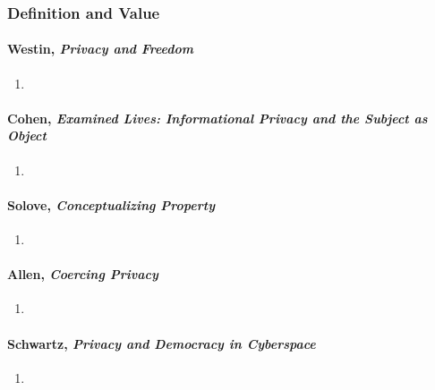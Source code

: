 
\subsubsection{Definition and Value}

\paragraph{Westin, \emph{Privacy and Freedom}}

\begin{enumerate}
    \item %
\end{enumerate}

\paragraph{Cohen, \emph{Examined Lives: Informational Privacy and the Subject 
as Object}}

\begin{enumerate}
    \item %
\end{enumerate}

\paragraph{Solove, \emph{Conceptualizing Property}}

\begin{enumerate}
    \item %
\end{enumerate}

\paragraph{Allen, \emph{Coercing Privacy}}

\begin{enumerate}
    \item %
\end{enumerate}

\paragraph{Schwartz, \emph{Privacy and Democracy in Cyberspace}}

\begin{enumerate}
    \item %
\end{enumerate}

